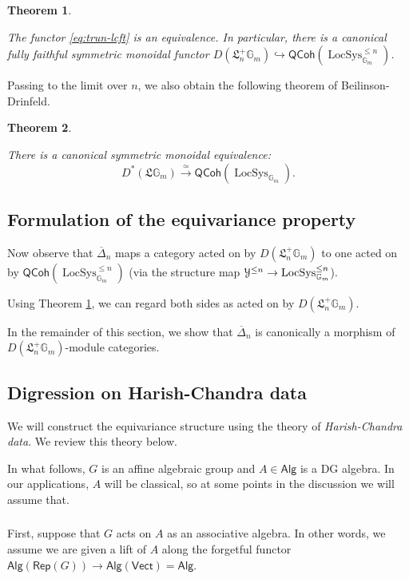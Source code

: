 \documentclass[reqno,11pt]{amsart}
\numberwithin{equation}{subsection}
\newtheorem{thm}{Theorem}[subsubsection]
\theoremstyle{remark}
\newcommand{\xar}[1]{\xrightarrow{#1}}
\newcommand{\rar}[1]{\xar{#1}}
\newcommand{\isom}{\rar{\simeq}}
\newcommand{\into}{\hookrightarrow}
\newcommand{\bG}{{\mathbb G}}
\newcommand{\sY}{{\EuScript Y}}
\newcommand{\fL}{{\mathfrak L}}
\newcommand{\on}{\operatorname}
\newcommand{\ol}[1]{\overline{#1}{}}
\newcommand{\Rep}{\mathsf{Rep}}
\newcommand{\Vect}{\mathsf{Vect}}
\newcommand{\LocSys}{\on{LocSys}}
\newcommand{\QCoh}{\mathsf{QCoh}}
\newcommand{\Alg}{\mathsf{Alg}}
\begin{document}
\begin{thm}\label{t:trun-lcft}

The functor \eqref{eq:trun-lcft} is an equivalence.
In particular, there is a canonical fully faithful symmetric monoidal functor
$D(\fL_n^+\bG_m) \into \QCoh(\LocSys_{\bG_m}^{\leq n})$.

\end{thm}

Passing to the limit over $n$, we also obtain the following theorem
of Beilinson-Drinfeld.

\begin{thm}\label{t:full-lcft}

There is a canonical symmetric monoidal equivalence:
%
\[
D^*(\fL\bG_m) \isom \QCoh(\LocSys_{\bG_m}).
\]

\end{thm}

\subsection{Formulation of the equivariance property}

Now observe that $\ol{\Delta}_n$ maps a category acted on by 
$D(\fL_n^+\bG_m)$ to one acted on by 
$\QCoh(\LocSys_{\bG_m}^{\leq n})$ (via the structure map 
$\sY^{\leq n} \to \LocSys_{\bG_m}^{\leq n}$).

Using Theorem \ref{t:trun-lcft}, we can regard both sides as 
acted on by $D(\fL_n^+\bG_m)$. 

In the remainder of this section, we show that 
$\ol{\Delta}_n$ is canonically a morphism of 
$D(\fL_n^+\bG_m)$-module categories.

\subsection{Digression on Harish-Chandra data}\label{ss:hc}

We will construct the equivariance structure using the theory of \emph{Harish-Chandra
data}. We review this theory below.

In what follows, $G$ is an affine algebraic group and $A \in \Alg$ is a DG algebra.
In our applications, $A$ will be classical, so at some points in the discussion we 
will assume that.

\subsubsection{} 

First, suppose that $G$ acts on $A$ as an associative algebra. In other words,
we assume we are given a lift of $A$ along the forgetful functor 
$\Alg(\Rep(G)) \to \Alg(\Vect) = \Alg$.
\end{document}
